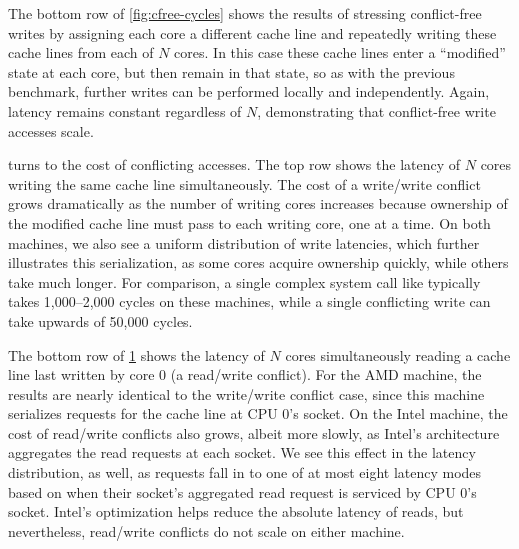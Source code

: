 The bottom row of \cref{fig:cfree-cycles} shows the results of
stressing conflict-free writes by assigning each core a different
cache line and repeatedly writing these cache lines from each of $N$
cores.  In this case these cache lines enter a ``modified'' state at
each core, but then remain in that state, so as with the previous
benchmark, further writes can be performed locally and independently.
%
Again, latency remains constant regardless of $N$, demonstrating that
conflict-free write accesses scale.

\begin{figure}
  \centering
  
  \label{fig:conflict-cycles}
\end{figure}

 turns to the cost of conflicting
accesses.  The top row shows the latency of $N$ cores writing the same
cache line simultaneously.  The cost of a write/write conflict grows
dramatically as the number of writing cores increases because
ownership of the modified cache line must pass to each writing
core, one at a time.  On both machines, we also see a uniform
distribution of write latencies, which further illustrates this
serialization, as some cores acquire ownership quickly, while others
take much longer.
%
For comparison, a single complex system call like 
typically takes 1,000--2,000 cycles on these machines, while a single
conflicting write can take upwards of 50,000 cycles.

The bottom row of \cref{fig:conflict-cycles} shows the latency of $N$
cores simultaneously reading a cache line last written by core 0 (a
read/write conflict).  For the AMD machine, the results are nearly
identical to the write/write conflict case, since this machine
serializes requests for the cache line at CPU 0's socket.  On the
Intel machine, the cost of read/write conflicts also grows, albeit
more slowly, as Intel's architecture aggregates the read requests at
each socket.
%
We see this effect in the latency distribution, as well, as requests
fall in to one of at most eight latency modes based on when their
socket's aggregated read request is serviced by CPU 0's socket.
Intel's optimization helps reduce the absolute
latency of reads, but nevertheless, read/write conflicts do not scale
on either machine.


